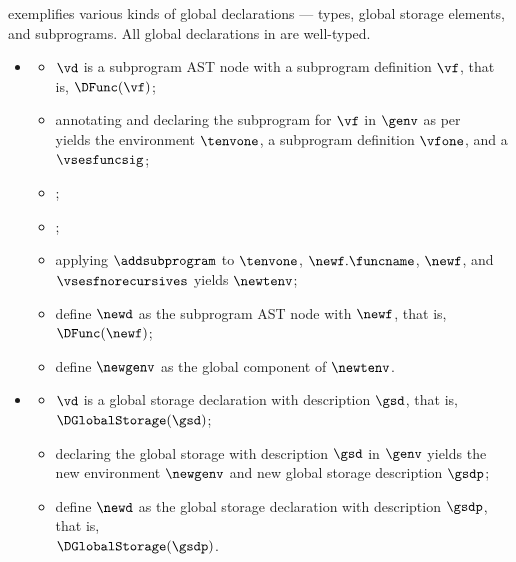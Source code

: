  exemplifies various kinds of global declarations ---
types, global storage elements, and subprograms.
All global declarations in  are well-typed.

\ProseParagraph
\OneApplies
\begin{itemize}
  \item {}
  \begin{itemize}
    \item $\vd$ is a subprogram AST node with a subprogram definition $\vf$, that is, $\DFunc(\vf)$;
    \item annotating and declaring the subprogram for $\vf$ in $\genv$ as per \\
          yields the environment $\tenvone$, a subprogram definition $\vfone$,
          and a \sideeffectdescriptorsetsterm{} $\vsesfuncsig$\ProseOrTypeError;
    \item \Proseannotatesubprogram{$\tenv$}{$\vfone$}{\vsesfuncsig}{$\newf$}{$\vsesf$}\ProseOrTypeError;
    \item {};
    \item applying $\addsubprogram$ to $\tenvone$, $\newf.\funcname$, $\newf$, and $\vsesfnorecursives$ yields $\newtenv$;
    \item define $\newd$ as the subprogram AST node with $\newf$, that is, $\DFunc(\newf)$;
    \item define $\newgenv$ as the global component of $\newtenv$.
  \end{itemize}

  \item {}
  \begin{itemize}
    \item $\vd$ is a global storage declaration with description $\gsd$, that is, \\ $\DGlobalStorage(\gsd)$;
    \item declaring the global storage with description $\gsd$ in $\genv$ yields the new environment
          $\newgenv$ and new global storage description $\gsdp$\ProseOrTypeError;
    \item define $\newd$ as the global storage declaration with description $\gsdp$, that is, \\ $\DGlobalStorage(\gsdp)$.
  \end{itemize}


\end{itemize}
